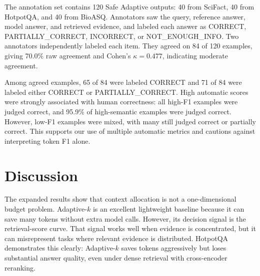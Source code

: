 \documentclass[11pt]{article}
\begin{document}
The annotation set contains 120 Safe Adaptive outputs: 40 from SciFact, 40 from HotpotQA, and 40 from BioASQ. Annotators saw the query, reference answer, model answer, and retrieved evidence, and labeled each answer as CORRECT, PARTIALLY\_CORRECT, INCORRECT, or NOT\_ENOUGH\_INFO. Two annotators independently labeled each item. They agreed on 84 of 120 examples, giving 70.0\% raw agreement and Cohen's $\kappa = 0.477$, indicating moderate agreement.

\begin{table}[t]
\centering
\small
\caption{Human labels for agreed annotation examples only.}
\label{tab:annotation_agreed}
\end{table}

Among agreed examples, 65 of 84 were labeled CORRECT and 71 of 84 were labeled either CORRECT or PARTIALLY\_CORRECT. High automatic scores were strongly associated with human correctness: all high-F1 examples were judged correct, and 95.9\% of high-semantic examples were judged correct. However, low-F1 examples were mixed, with many still judged correct or partially correct. This supports our use of multiple automatic metrics and cautions against interpreting token F1 alone.

\section{Discussion}

The expanded results show that context allocation is not a one-dimensional budget problem. Adaptive-$k$ is an excellent lightweight baseline because it can save many tokens without extra model calls. However, its decision signal is the retrieval-score curve. That signal works well when evidence is concentrated, but it can misrepresent tasks where relevant evidence is distributed. HotpotQA demonstrates this clearly: Adaptive-$k$ saves tokens aggressively but loses substantial answer quality, even under dense retrieval with cross-encoder reranking.
\end{document}
